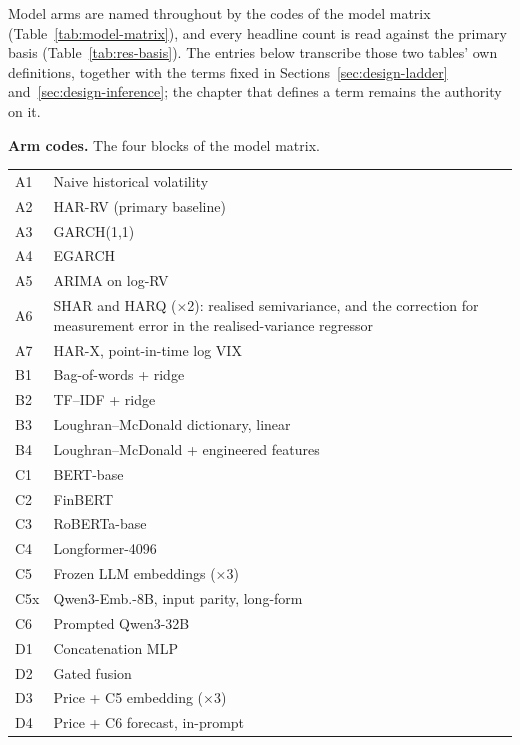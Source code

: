 Model arms are named throughout by the codes of the model matrix
(Table~\ref{tab:model-matrix}), and every headline count is read against the
primary basis (Table~\ref{tab:res-basis}). The entries below transcribe those two
tables' own definitions, together with the terms fixed in
Sections~\ref{sec:design-ladder} and~\ref{sec:design-inference}; the chapter
that defines a term remains the authority on it.

\vspace{2mm}
\noindent\textbf{Arm codes.} The four blocks of the model matrix.
\par\nobreak
\vspace{1mm}
{\small\singlespacing
\noindent\begin{tabular}{@{}>{\raggedright\arraybackslash}p{}>{\raggedright\arraybackslash}p{}@{}}
\toprule
A1 & Naive historical volatility \\
A2 & HAR-RV (primary baseline) \\
A3 & GARCH(1,1) \\
A4 & EGARCH \\
A5 & ARIMA on log-RV \\
A6 & SHAR and HARQ ($\times$2): realised semivariance, and the correction for measurement error in the realised-variance regressor \\
A7 & HAR-X, point-in-time log VIX \\
\midrule
B1 & Bag-of-words + ridge \\
B2 & TF--IDF + ridge \\
B3 & Loughran--McDonald dictionary, linear \\
B4 & Loughran--McDonald + engineered features \\
\midrule
C1 & BERT-base \\
C2 & FinBERT \\
C3 & RoBERTa-base \\
C4 & Longformer-4096 \\
C5 & Frozen LLM embeddings ($\times$3) \\
C5x & Qwen3-Emb.-8B, input parity, long-form \\
C6 & Prompted Qwen3-32B \\
\midrule
D1 & Concatenation MLP \\
D2 & Gated fusion \\
D3 & Price + C5 embedding ($\times$3) \\
D4 & Price + C6 forecast, in-prompt \\
\bottomrule
\end{tabular}\par
}

